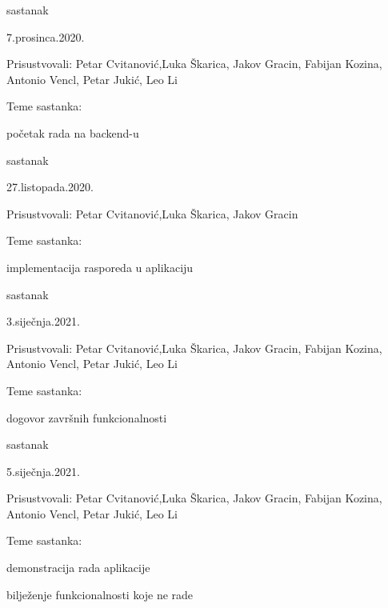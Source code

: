 \begin{packed_enum}
			\item  sastanak
			\item[] \begin{packed_item}
					\item 7.prosinca.2020.
				\item Prisustvovali: Petar Cvitanović,Luka Škarica, Jakov Gracin, Fabijan Kozina, Antonio Vencl, Petar Jukić, Leo Li
				\item Teme sastanka:
				\begin{packed_item}
					\item  početak rada na backend-u
					\newline
					\newline
				\end{packed_item}
			\end{packed_item}
			
			\item  sastanak
			\item[] \begin{packed_item}
					\item 27.listopada.2020.
				\item Prisustvovali: Petar Cvitanović,Luka Škarica, Jakov Gracin
				\item Teme sastanka:
				\begin{packed_item}
					\item  implementacija rasporeda u aplikaciju
				\end{packed_item}
			\end{packed_item}
			
			\item  sastanak
			\item[] \begin{packed_item}
					\item 3.siječnja.2021.
				\item Prisustvovali: Petar Cvitanović,Luka Škarica, Jakov Gracin, Fabijan Kozina, Antonio Vencl, Petar Jukić, Leo Li
				\item Teme sastanka:
				\begin{packed_item}
					\item  dogovor završnih funkcionalnosti
				\end{packed_item}
			\end{packed_item}
			
			\item  sastanak
			\item[] \begin{packed_item}
					\item 5.siječnja.2021.
				\item Prisustvovali: Petar Cvitanović,Luka Škarica, Jakov Gracin, Fabijan Kozina, Antonio Vencl, Petar Jukić, Leo Li
				\item Teme sastanka:
				\begin{packed_item}
					\item  demonstracija rada aplikacije
					\item bilježenje funkcionalnosti koje ne rade
				\end{packed_item}
			\end{packed_item}
			

\end{packed_enum}
